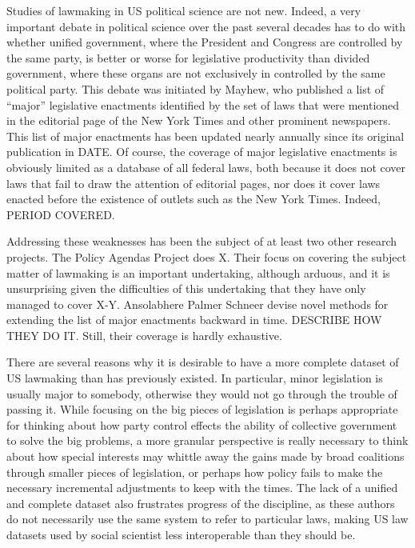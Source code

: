 \documentclass[fleqn,10pt]{wlscirep}
\begin{document}
Studies of lawmaking in US political science are not new. Indeed, a very important debate in political science over the past several decades has to do with whether unified government, where the President and Congress are controlled by the same party, is better or worse for legislative productivity than divided government, where these organs are not exclusively in controlled by the same political party. This debate was initiated by Mayhew, who published a list of ``major'' legislative enactments identified by the set of laws that were mentioned in the editorial page of the New York Times and other prominent newspapers. This list of major enactments has been updated nearly annually since its original publication in DATE. Of course, the coverage of major legislative enactments is obviously limited as a database of all federal laws, both because it does not cover laws that fail to draw the attention of editorial pages, nor does it cover laws enacted before the existence of outlets such as the New York Times.  Indeed, PERIOD COVERED. 

Addressing these weaknesses has been the subject of at least two other research projects. The Policy Agendas Project does X. Their focus on covering the subject matter of lawmaking is an important undertaking, although arduous, and it is unsurprising given the difficulties of this undertaking that they have only managed to cover X-Y. Ansolabhere Palmer Schneer devise novel methods for extending the list of major enactments backward in time. DESCRIBE HOW THEY DO IT. Still, their coverage is hardly exhaustive. 

There are several reasons why it is desirable to have a more complete dataset of US lawmaking than has previously existed. In particular, minor legislation is usually major to somebody, otherwise they would not go through the trouble of passing it. While focusing on the big pieces of legislation is perhaps appropriate for thinking about how party control effects the ability of collective government to solve the big problems, a more granular perspective is really necessary to think about how special interests may whittle away the gains made by broad coalitions through smaller pieces of legislation, or perhaps how policy fails to make the necessary incremental adjustments to keep with the times. The lack of a unified and complete dataset also frustrates progress of the discipline, as these authors do not necessarily use the same system to refer to particular laws, making US law datasets used by social scientist less interoperable than they should be. 
\end{document}
